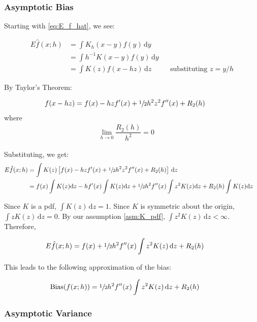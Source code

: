 \subsubsection{Asymptotic Bias}

Starting with \autoref{eq:E_f_hat}, we see:

\begin{align}
E\hat{f}(x;h) & = \int{K_h(x - y)f(y)\,\mathrm{d}y} && \nonumber \\
    & = \int{h^{-1}K(x-y)f(y)\,\mathrm{d}y} && \nonumber \\
    & = \int{K(z)f(x-hz)\,\mathrm{d}z} && \text{substituting } z=y/h
\end{align}

By Taylor's Theorem:

\begin{align}
f(x-hz) & = f(x) - hzf^\prime(x) + \sfrac{1}{2}h^2z^2f^{\prime\prime}(x) + R_2(h) &&
\end{align}
where
\begin{align}
\lim_{h \to 0} \dfrac{R_2(h)}{h^2} = 0 && \nonumber
\end{align}

Substituting, we get:
\begin{align}
E\hat{f}(x;h) & = \int{K(z) \left[ f(x) - hzf^\prime(x) + \sfrac{1}{2}h^2z^2f^{\prime\prime}(x) + R_2(h) \right] \,\mathrm{d}z} && \nonumber \\
    & = f(x)\int{K(z)\mathrm{d}z} - hf^\prime(x)\int{K(z)\mathrm{d}z} + \sfrac{1}{2}h^2f^{\prime\prime}(x)\int{z^2K(z)\mathrm{d}z} + R_2(h)\int{K(z)\mathrm{d}z} && \nonumber
\end{align}

Since $K$ is a pdf, $\int{K(z)\,\mathrm{d}z}=1$.
Since $K$ is symmetric about the origin, $\int{zK(z)\,\mathrm{d}z}=0$.
By our assumption \ref{asm:K_pdf}, $\int{z^2K(z)\,\mathrm{d}z} < \infty$.
Therefore,

\begin{align}
E\hat{f}(x;h) & = f(x) + \sfrac{1}{2}h^2f^{\prime\prime}(x)\int{z^2K(z)\,\mathrm{d}z} + R_2(h) && \nonumber
\end{align}

This leads to the following approximation of the bias:

\begin{align}
\mbox{Bias}(f(x;h)) & = \sfrac{1}{2}h^2f^{\prime\prime}(x)\int{z^2K(z)\,\mathrm{d}z} + R_2(h) && \label{eq:ABias}
\end{align}

\subsubsection{Asymptotic Variance}

